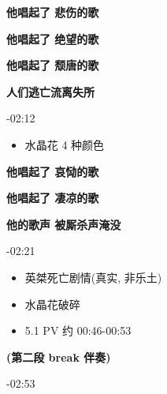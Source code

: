 \documentclass[a4paper]{article}
\begin{document}
\textbf{他唱起了 悲伤的歌}

\textbf{他唱起了 绝望的歌}

\textbf{他唱起了 颓唐的歌}

\textbf{人们逃亡流离失所}

-02:12

\begin{itemize}
    \item 水晶花 4 种颜色
\end{itemize}

\textbf{他唱起了 哀恸的歌}

\textbf{他唱起了 凄凉的歌}

\textbf{他的歌声 被厮杀声淹没}

-02:21

\begin{itemize}
    \item 英桀死亡剧情(真实, 非乐土)
    \item 水晶花破碎
\end{itemize}

\begin{itemize}
    \item 5.1 PV 约 00:46-00:53
\end{itemize}

\textbf{(第二段 break 伴奏)}

-02:53
\end{document}
